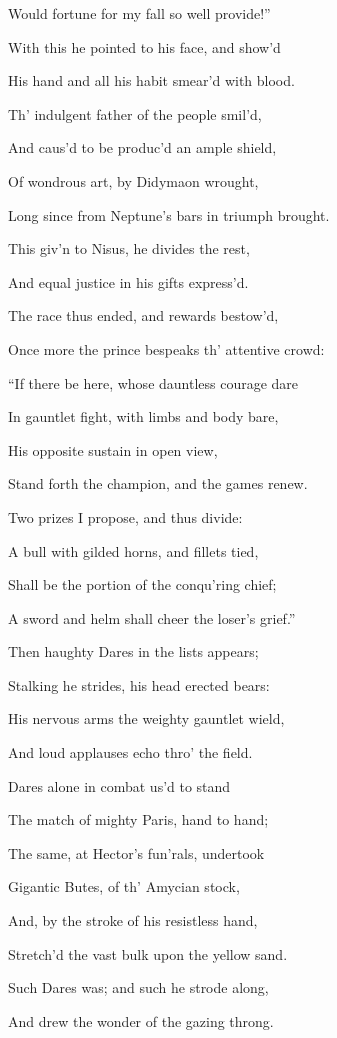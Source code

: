 Would fortune for my fall so well provide!”

With this he pointed to his face, and show’d

His hand and all his habit smear’d with blood.

Th’ indulgent father of the people smil’d,

And caus’d to be produc’d an ample shield,

Of wondrous art, by Didymaon wrought,

Long since from Neptune’s bars in triumph brought.

This giv’n to Nisus, he divides the rest,

And equal justice in his gifts express’d.

The race thus ended, and rewards bestow’d,

Once more the prince bespeaks th’ attentive crowd:

“If there be here, whose dauntless courage dare

In gauntlet fight, with limbs and body bare,

His opposite sustain in open view,

Stand forth the champion, and the games renew.

Two prizes I propose, and thus divide:

A bull with gilded horns, and fillets tied,

Shall be the portion of the conqu’ring chief;

A sword and helm shall cheer the loser’s grief.”

Then haughty Dares in the lists appears;

Stalking he strides, his head erected bears:

His nervous arms the weighty gauntlet wield,

And loud applauses echo thro’ the field.

Dares alone in combat us’d to stand

The match of mighty Paris, hand to hand;

The same, at Hector’s fun’rals, undertook

Gigantic Butes, of th’ Amycian stock,

And, by the stroke of his resistless hand,

Stretch’d the vast bulk upon the yellow sand.

Such Dares was; and such he strode along,

And drew the wonder of the gazing throng.


